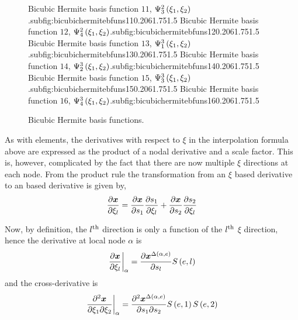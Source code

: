 \begin{figure}[hbtp]
     {Bicubic Hermite basis function $11$, $   \Psi_{3}^{2} \left( \xi_{1},\xi_{2} \right)  $.}{subfig:bicubichermitebfuns11}{0.20\linewidth}{6}{1.75}{1.5}
   \hfil
     {Bicubic Hermite basis function $12$, $   \Psi_{4}^{2} \left( \xi_{1},\xi_{2} \right)  $.}{subfig:bicubichermitebfuns12}{0.20\linewidth}{6}{1.75}{1.5}
     {Bicubic Hermite basis function $13$, $   \Psi_{1}^{3} \left( \xi_{1},\xi_{2} \right)  $.}{subfig:bicubichermitebfuns13}{0.20\linewidth}{6}{1.75}{1.5}
   \hfil
     {Bicubic Hermite basis function $14$, $   \Psi_{2}^{3} \left( \xi_{1},\xi_{2} \right)  $.}{subfig:bicubichermitebfuns14}{0.20\linewidth}{6}{1.75}{1.5}
   \hfil
     {Bicubic Hermite basis function $15$, $   \Psi_{3}^{3} \left( \xi_{1},\xi_{2} \right)  $.}{subfig:bicubichermitebfuns15}{0.20\linewidth}{6}{1.75}{1.5}
   \hfil
     {Bicubic Hermite basis function $16$, $   \Psi_{4}^{3} \left( \xi_{1},\xi_{2} \right)  $.}{subfig:bicubichermitebfuns16}{0.20\linewidth}{6}{1.75}{1.5}
   \caption[Bicubic Hermite basis functions.]{Bicubic Hermite basis functions.}
   \label{fig:BicubicHermiteBFuns}
\end{figure}

As with \onedal \cubicherm elements, the derivatives with respect to $\xi$ in
the \twodal interpolation formula above are expressed as the product of a
nodal \arclen derivative and a scale factor. This is, however, complicated by
the fact that there are now multiple $\xi$ directions at each node. From the
product rule the transformation from an $\xi$ based derivative to an \arclen
based derivative is given by,
\begin{equation}
  \delby{\vect{x}}{\xi_{l}}=\delby{\vect{x}}{s_{1}}\delby{s_{1}}{\xi_{l}}+
  \delby{\vect{x}}{s_{2}}\delby{s_{2}}{\xi_{l}}
  \label{eqn:xitosproductrule}
\end{equation}

Now, by definition, the ${l}^{\text{th}}$ \arclen direction is only a function of the
${l}^{\text{th}}$ $\xi$ direction, hence the derivative at local node $\alpha$ is
\begin{equation}
  \evalat{\delby{\vect{x}}{\xi_{l}}}{\alpha}=\delby{\nodept{\vect{x}}{
      \fnof{\Delta}{\alpha,e}}}{s_{l}}\esftwo{e}{l}
  \label{eqn:xitosbich}
\end{equation}
and the cross-derivative is
\begin{equation}
  \evalat{\deltwoby{\vect{x}}{\xione}{\xitwo}}{\alpha}=
  \deltwoby{\nodept{\vect{x}}{\fnof{\Delta}{\alpha,e}}}{s_{1}}{s_{2}}\esftwo{e}{1}
  \esftwo{e}{2}
  \label{eqn:xitosbichcd}
\end{equation}

